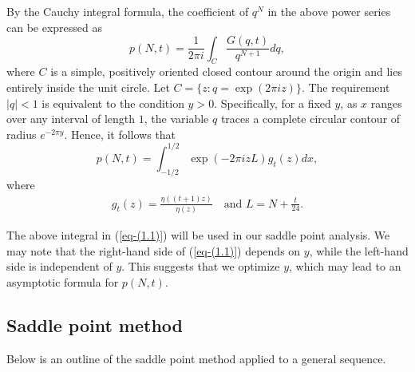 \documentclass[11pt]{amsart}
\theoremstyle{plain}
\numberwithin{equation}{section}
\begin{document}
	By the Cauchy integral formula, the coefficient of $q^{N}$ in the above power series can be expressed as
	\begin{equation*}
		p(N,t)=\frac{1}{2\pi i}\int_{C}\frac{G(q,t)}{q^{N+1}}dq,
	\end{equation*}
	where $C$ is a simple, positively oriented closed contour around the origin and lies entirely inside the unit circle.  Let $C=\{z:q=\exp(2\pi i z)\}$. The requirement $|q| < 1$ is equivalent to the condition $y > 0$. Specifically, for a fixed $y$, as $x$ ranges over any interval of length $1$, the variable $q$ traces a complete circular contour of radius $e^{-2\pi y}$. Hence, it follows that
	\begin{equation}\label{eq-(1.1)}
		p(N,t)=\int_{-1/2}^{1/2}\exp\left(-2\pi izL\right)g_{t}(z)dx, 
	\end{equation}
	where
	\begin{align}\label{eq-gtz}
		g_{t}(z)=\frac{\eta((t+1)z)}{\eta(z)}\quad\text{and  } L=N+\frac{t}{24}.
	\end{align} 
	
	The above integral in (\ref{eq-(1.1)}) will be used in our saddle point analysis. We may note that the right-hand side of (\ref{eq-(1.1)}) depends on $y$, while the left-hand side is independent of $y$. This suggests that we optimize $y$, which may lead to an asymptotic formula for $p(N,t)$.
	\subsection{\texorpdfstring{Saddle point method}{}}
	Below is an outline of the saddle point method applied to a general sequence. 
	
\end{document}
